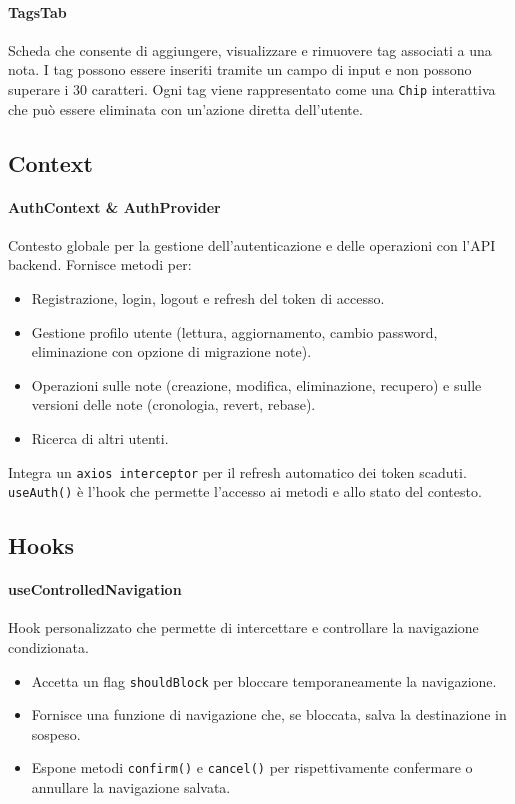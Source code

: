 \documentclass[11pt]{article}
\begin{document}
\paragraph{TagsTab} 
Scheda che consente di aggiungere, visualizzare e rimuovere tag associati a una nota. 
I tag possono essere inseriti tramite un campo di input e non possono superare i 30 caratteri. 
Ogni tag viene rappresentato come una \texttt{Chip} interattiva che può essere eliminata con un’azione diretta dell’utente.

\subsection{Context}
\paragraph{AuthContext \& AuthProvider}  
Contesto globale per la gestione dell’autenticazione e delle operazioni con l’API backend.  
Fornisce metodi per:  
\begin{itemize}
  \item Registrazione, login, logout e refresh del token di accesso.  
  \item Gestione profilo utente (lettura, aggiornamento, cambio password, eliminazione con opzione di migrazione note).  
  \item Operazioni sulle note (creazione, modifica, eliminazione, recupero) e sulle versioni delle note (cronologia, revert, rebase).  
  \item Ricerca di altri utenti.  
\end{itemize}
Integra un \texttt{axios interceptor} per il refresh automatico dei token scaduti.  
\texttt{useAuth()} è l’hook che permette l’accesso ai metodi e allo stato del contesto. 

\subsection{Hooks}
\paragraph{useControlledNavigation}  
Hook personalizzato che permette di intercettare e controllare la navigazione condizionata.  
\begin{itemize}
  \item Accetta un flag \texttt{shouldBlock} per bloccare temporaneamente la navigazione.  
  \item Fornisce una funzione di navigazione che, se bloccata, salva la destinazione in sospeso.  
  \item Espone metodi \texttt{confirm()} e \texttt{cancel()} per rispettivamente confermare o annullare la navigazione salvata.  
\end{itemize}
\end{document}
